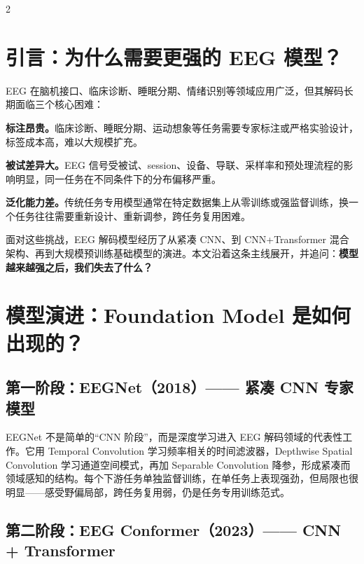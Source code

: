 \documentclass[12pt, a0paper]{article}
\begin{document}
\begin{multicols}{2}

\section{引言：为什么需要更强的 EEG 模型？}

EEG 在脑机接口、临床诊断、睡眠分期、情绪识别等领域应用广泛，但其解码长期面临三个核心困难：

\textbf{标注昂贵。}临床诊断、睡眠分期、运动想象等任务需要专家标注或严格实验设计，标签成本高，难以大规模扩充。

\textbf{被试差异大。}EEG 信号受被试、session、设备、导联、采样率和预处理流程的影响明显，同一任务在不同条件下的分布偏移严重。

\textbf{泛化能力差。}传统任务专用模型通常在特定数据集上从零训练或强监督训练，换一个任务往往需要重新设计、重新调参，跨任务复用困难。

面对这些挑战，EEG 解码模型经历了从紧凑 CNN、到 CNN+Transformer 混合架构、再到大规模预训练基础模型的演进。本文沿着这条主线展开，并追问：\textbf{模型越来越强之后，我们失去了什么？}

\section{模型演进：Foundation Model 是如何出现的？}

\subsection{第一阶段：EEGNet（2018）—— 紧凑 CNN 专家模型}

EEGNet 不是简单的“CNN 阶段”，而是深度学习进入 EEG 解码领域的代表性工作。它用 Temporal Convolution 学习频率相关的时间滤波器，Depthwise Spatial Convolution 学习通道空间模式，再加 Separable Convolution 降参，形成紧凑而领域感知的结构。每个下游任务单独监督训练，在单任务上表现强劲，但局限也很明显——感受野偏局部，跨任务复用弱，仍是任务专用训练范式。

\subsection{第二阶段：EEG Conformer（2023）—— CNN + Transformer}


\end{multicols}
\end{document}
